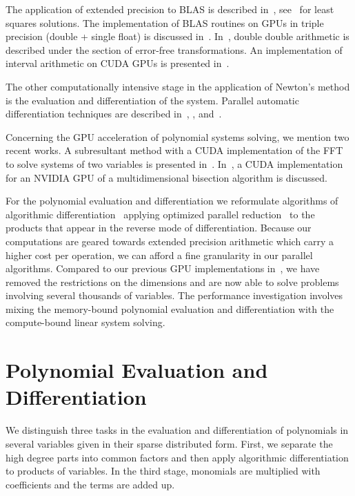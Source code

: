 \documentclass{article}
\begin{document}
The application of extended precision to BLAS 
is described in~\cite{BLAS02},
see~\cite{DHLR09} for least squares solutions. 
The implementation of BLAS routines on GPUs in
triple precision (double + single float) is discussed in~\cite{MT12}.
In~\cite{Rum10}, double double arithmetic is described under the
section of error-free transformations.
An implementation of interval arithmetic on CUDA GPUs is
presented in~\cite{CDD12}.

The other computationally intensive stage in the application
of Newton's method is the evaluation and differentiation of the system.
Parallel automatic differentiation techniques are
described in~\cite{BGKW08}, \cite{GPGK08}, and~\cite{UHHHHN09}.

Concerning the GPU acceleration of polynomial systems solving,
we mention two recent works.
A subresultant method with a CUDA implementation of the FFT 
to solve systems of two variables is presented in~\cite{MP11}.
In~\cite{KP12}, a CUDA implementation for an NVIDIA GPU
of a multidimensional bisection algorithm is discussed.

For the polynomial evaluation and differentiation we reformulate
algorithms of algorithmic differentiation~\cite{GW08} applying 
optimized parallel reduction~\cite{Harris} to the products that 
appear in the reverse mode of differentiation.
Because our computations are geared towards
extended precision arithmetic which carry a higher cost per operation,
we can afford a fine granularity in our parallel algorithms.
Compared to our previous GPU implementations in~\cite{VY12,VY13},
we have removed the restrictions on the dimensions and are now able
to solve problems involving several thousands of variables.
The performance investigation involves mixing the memory-bound
polynomial evaluation and differentiation with the compute-bound
linear system solving.

\section{Polynomial Evaluation and Differentiation}

We distinguish three tasks in the evaluation and differentiation
of polynomials in several variables given in their sparse
distributed form.  First, we separate the high degree parts
into common factors and then apply algorithmic differentiation
to products of variables.  In the third stage, monomials are
multiplied with coefficients and the terms are added up.
\end{document}
